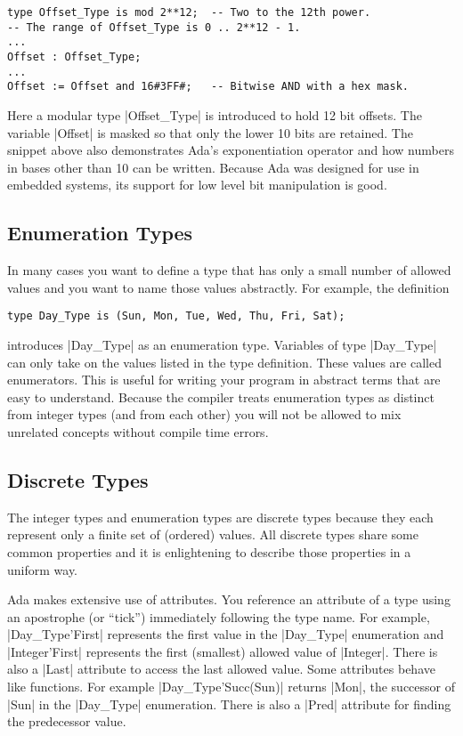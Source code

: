 \begin{lstlisting}
type Offset_Type is mod 2**12;  -- Two to the 12th power.
-- The range of Offset_Type is 0 .. 2**12 - 1.
...
Offset : Offset_Type;
...
Offset := Offset and 16#3FF#;   -- Bitwise AND with a hex mask.
\end{lstlisting}

\noindent Here a modular type |Offset_Type| is introduced to hold 12 bit offsets. The variable
|Offset| is masked so that only the lower 10 bits are retained. The snippet above also
demonstrates Ada's exponentiation operator and how numbers in bases other than 10 can be
written. Because Ada was designed for use in embedded systems, its support for low level bit
manipulation is good.

\subsection{Enumeration Types}

In many cases you want to define a type that has only a small number of allowed values and you
want to name those values abstractly. For example, the definition

\begin{lstlisting}
type Day_Type is (Sun, Mon, Tue, Wed, Thu, Fri, Sat);
\end{lstlisting}

\noindent introduces |Day_Type| as an enumeration type. Variables of type |Day_Type| can only
take on the values listed in the type definition. These values are called enumerators. This is
useful for writing your program in abstract terms that are easy to understand. Because the
compiler treats enumeration types as distinct from integer types (and from each other) you will
not be allowed to mix unrelated concepts without compile time errors.

\subsection{Discrete Types}

The integer types and enumeration types are discrete types because they each represent only a
finite set of (ordered) values. All discrete types share some common properties and it is
enlightening to describe those properties in a uniform way.

Ada makes extensive use of attributes. You reference an attribute of a type using an apostrophe
(or ``tick'') immediately following the type name. For example, |Day_Type'First| represents the
first value in the |Day_Type| enumeration and |Integer'First| represents the first (smallest)
allowed value of |Integer|. There is also a |Last| attribute to access the last allowed value.
Some attributes behave like functions. For example |Day_Type'Succ(Sun)| returns |Mon|, the
successor of |Sun| in the |Day_Type| enumeration. There is also a |Pred| attribute for finding
the predecessor value.

